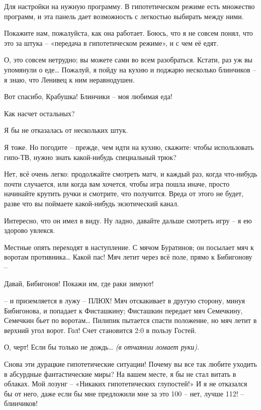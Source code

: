 \documentclass[../main.tex]{subfiles}
\begin{document}
\begin{dialogue}
 Для настройки на нужную программу. В гипотетическом режиме есть множество программ, и эта панель дает возможность с легкостью выбирать между ними.

 Покажите нам, пожалуйста, как она работает. Боюсь, что я не совсем понял, что это за штука \--- «передача в гипотетическом режиме», и с чем её едят.

 О, это совсем нетрудно; вы можете сами во всем разобраться. Кстати, раз уж вы упомянули о еде\ldots{} Пожалуй, я пойду на кухню и поджарю несколько блинчиков \--- я знаю, что Ленивец к ним неравнодушен.

 Вот спасибо, Крабушка! Блинчики \--- моя любимая еда!

 Как насчет остальных?

 Я бы не отказалась от нескольких штук.

 Я тоже. Но погодите \--- прежде, чем идти на кухню, скажите: чтобы использовать гипо-ТВ, нужно знать какой-нибудь специальный трюк?

 Нет, всё очень легко: продолжайте смотреть матч, и каждый раз, когда что-нибудь почти случается, или когда вам хочется, чтобы игра пошла иначе, просто начинайте крутить ручки и смотрите, что получится. Вреда от этого не будет, разве что вы поймаете какой-нибудь экзотический канал.


 Интересно, что он имел в виду. Ну ладно, давайте дальше смотреть игру \--- я ею здорово увлекся.

 Местные опять переходят в наступление. С мячом Буратинов; он посылает мяч к воротам противника\ldots{} Какой пас! Мяч летит через всё поле, прямо к Бибигонову \---

 Давай, Бибигонов! Покажи им, где раки зимуют!

 \--- и приземляется в лужу \--- ПЛЮХ! Мяч отскакивает в другую сторону, минуя Бибигонова, и попадает к Фисташкину; Фисташкин передает мяч Семечкину, Семечкин бьет по воротам\ldots{} Пилипик пытается спасти положение, но мяч летит в верхний угол ворот. Гол! Счет становится 2:0 в пользу Гостей.

 О, черт! Если бы только не дождь\ldots{} \emph{(в отчаянии ломает руки)}.

 Снова эти дурацкие гипотетические ситуации! Почему вы все так любите уходить в абсурдные фантастические миры? На вашем месте, я бы не стал витать в облаках. Мой лозунг \--- «Никаких гипотетических глупостей!» И я не отказался бы от него, даже если бы мне предложили мне за это 100 \--- нет, лучше 112! \--- блинчиков!


\end{dialogue}
\end{document}
